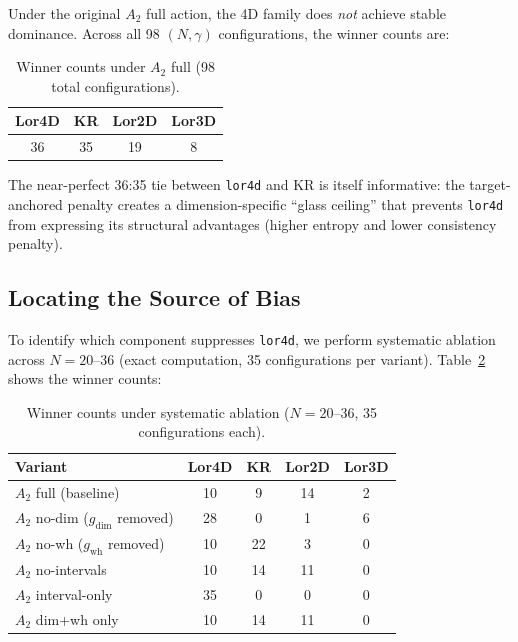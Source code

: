 \documentclass[11pt,a4paper]{article}
\begin{document}
Under the original $A_2$ full action, the 4D family does \emph{not} achieve stable dominance. Across all 98 $(N, \gamma)$ configurations, the winner counts are:

\begin{table}[H]
\centering
\caption{Winner counts under $A_2$ full (98 total configurations).}
\label{tab:A2full}
\begin{tabular}{cccc}
\toprule
Lor4D & KR & Lor2D & Lor3D \\
\midrule
36 & 35 & 19 & 8 \\
\bottomrule
\end{tabular}
\end{table}

The near-perfect 36:35 tie between \texttt{lor4d} and KR is itself informative: the target-anchored penalty creates a dimension-specific ``glass ceiling'' that prevents \texttt{lor4d} from expressing its structural advantages (higher entropy and lower consistency penalty).

\subsection{Locating the Source of Bias}

To identify which component suppresses \texttt{lor4d}, we perform systematic ablation across $N = 20$--$36$ (exact computation, 35 configurations per variant). Table~\ref{tab:ablation} shows the winner counts:

\begin{table}[H]
\centering
\caption{Winner counts under systematic ablation ($N = 20$--$36$, 35 configurations each).}
\label{tab:ablation}
\begin{tabular}{lcccc}
\toprule
\textbf{Variant} & \textbf{Lor4D} & \textbf{KR} & \textbf{Lor2D} & \textbf{Lor3D} \\
\midrule
$A_2$ full (baseline) & 10 & 9 & 14 & 2 \\
$A_2$ no-dim ($g_{\text{dim}}$ removed) & 28 & 0 & 1 & 6 \\
$A_2$ no-wh ($g_{\text{wh}}$ removed) & 10 & 22 & 3 & 0 \\
$A_2$ no-intervals & 10 & 14 & 11 & 0 \\
$A_2$ interval-only & 35 & 0 & 0 & 0 \\
$A_2$ dim+wh only & 10 & 14 & 11 & 0 \\
\bottomrule
\end{tabular}
\end{table}
\end{document}
